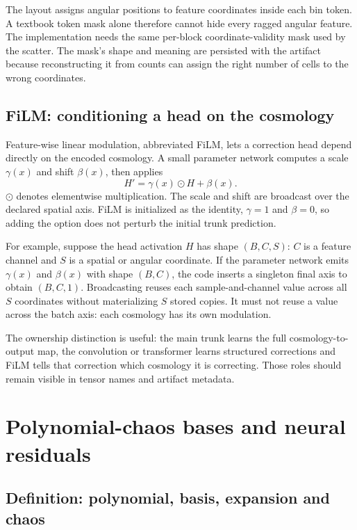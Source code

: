 \documentclass[10pt,aps,prd,twocolumn,nofootinbib]{revtex4-2}
\begin{document}
The layout assigns angular positions to feature coordinates inside each bin
token.  A textbook token mask alone
therefore cannot hide every ragged angular feature.  The implementation needs
the same per-block coordinate-validity mask used by the scatter.  The mask's
shape and meaning are persisted with the artifact because reconstructing it
from counts can assign the right number of cells to the wrong coordinates.

\subsection{FiLM: conditioning a head on the cosmology}

Feature-wise linear modulation, abbreviated FiLM, lets a correction head
depend directly on the encoded cosmology.  A small parameter network computes
a scale $\gamma(x)$ and shift $\beta(x)$, then applies
\begin{equation*}
  H'=\gamma(x)\odot H+\beta(x).
\end{equation*}
$\odot$ denotes elementwise multiplication.  The scale and shift are
broadcast over the declared spatial axis.  FiLM is initialized as the
identity, $\gamma=1$ and $\beta=0$, so adding the option does not perturb the
initial trunk prediction.

For example, suppose the head activation $H$ has shape $(B,C,S)$: $C$ is a
feature channel and $S$ is a spatial or angular coordinate.  If the parameter
network emits $\gamma(x)$ and $\beta(x)$ with shape $(B,C)$, the code inserts
a singleton final axis to obtain $(B,C,1)$.  Broadcasting reuses each
sample-and-channel value across all $S$ coordinates without materializing
$S$ stored copies.  It must not reuse a value across the batch axis: each
cosmology has its own modulation.

The ownership distinction is useful: the main trunk learns the full
cosmology-to-output map, the convolution or transformer learns structured
corrections and FiLM tells that correction which cosmology it is correcting.
Those roles should remain visible in tensor names and artifact metadata.

\section{Polynomial-chaos bases and neural residuals}
\label{sec:pce}

\subsection{Definition: polynomial, basis, expansion and chaos}
\end{document}
